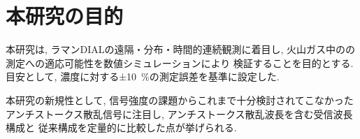 


\section{本研究の目的}
本研究は, ラマンDIALの遠隔・分布・時間的連続観測に着目し, 
火山ガス中のの測定への適応可能性を数値シミュレーションにより
検証することを目的とする.
目安として, 濃度に対する±\qty{10}{\%}の測定誤差を基準に設定した. 

本研究の新規性として, 
信号強度の課題からこれまで十分検討されてこなかった
アンチストークス散乱信号に注目し, 
アンチストークス散乱波長を含む受信波長構成と
従来構成を定量的に比較した点が挙げられる. 
